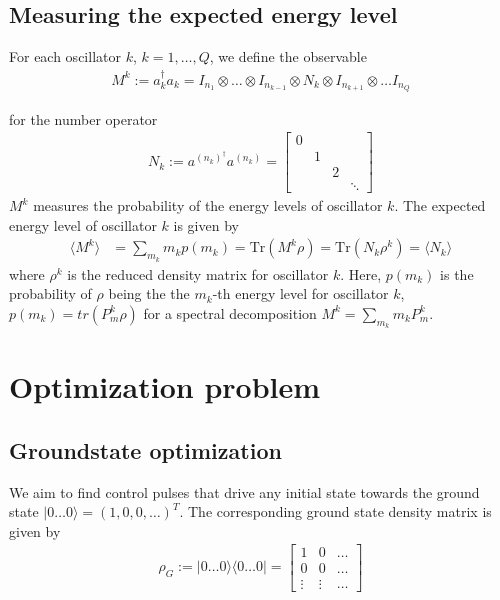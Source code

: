 \documentclass[letterpaper]{article}
\begin{document}
\subsection{Measuring the expected energy level}
For each oscillator $k$, $k=1,\dots, Q$, we define the observable 
\begin{align}
  M^k := a_k^\dag a_k  = I_{n_1} \otimes \dots \otimes I_{n_{k-1}} \otimes  N_k \otimes I_{n_{k+1}} \otimes \dots I_{n_Q} 
\end{align}
       
       \quad
for the number operator 
\begin{align}
  N_k := a^{(n_k)^\dag} a^{(n_k)} = \begin{bmatrix} 
   0 &    &    & \\
     &  1 &    &\\
     &    &  2 &\\
     &    &    & \ddots 
  \end{bmatrix}
\end{align}
$M^k$ measures the probability of the energy levels of oscillator $k$. The expected energy level of oscillator $k$ is given by 
\begin{align}
  \langle M^k \rangle &= \sum_{m_k} m_k p(m_k)  = \mbox{Tr}(M^k\rho) = \mbox{Tr}(N_k \rho^k)  = \langle N_k\rangle
\end{align}
where $\rho^k$ is the reduced density matrix for oscillator $k$. Here, $p(m_k)$ is the probability of $\rho$ being the the $m_k$-th energy level for oscillator $k$, $p(m_k) = tr(P^k_m \rho)$ for a spectral decomposition $M^k = \sum_{m_k} m_kP^k_m$. 


\section{Optimization problem}

\subsection{Groundstate optimization}
We aim to find control pulses that drive any initial state towards the ground state $|0\dots 0\rangle = (1, 0, 0, \dots )^T$. The corresponding ground state density matrix is given by
\begin{align}
      \rho_{G} := |0\dots 0\rangle \langle 0 \dots 0 | = \begin{bmatrix} 1      & 0      &  \dots   \\ 
                                         0      & 0      &  \dots  \\ 
                                         \vdots & \vdots &  \dots 
                    \end{bmatrix}
\end{align}
\end{document}
